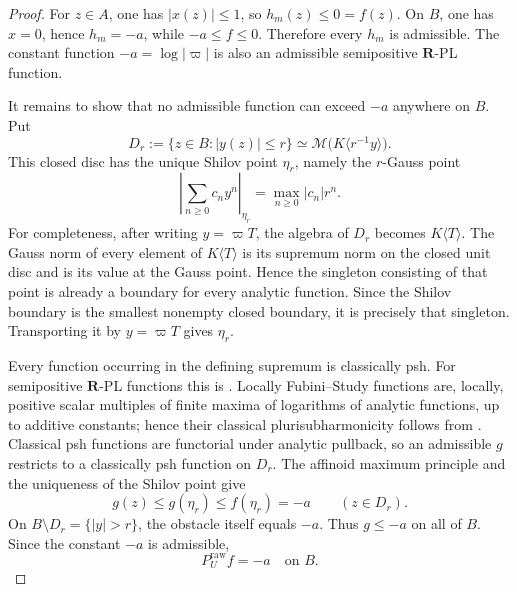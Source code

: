 \begin{proof}
For $z\in A$, one has $|x(z)|\leq1$, so $h_m(z)\leq0=f(z)$.
On $B$, one has $x=0$, hence $h_m=-a$, while
$-a\leq f\leq0$.  Therefore every $h_m$ is admissible.  The constant
function $-a=\log|\varpi|$ is also an admissible semipositive
$\mathbf R$-PL function.

It remains to show that no admissible function can exceed $-a$ anywhere
on $B$.  Put
\[
 D_r:=\{z\in B:|y(z)|\leq r\}
       \simeq\mathcal M\bigl(K\langle r^{-1}y\rangle\bigr).
\]
This closed disc has the unique Shilov point $\eta_r$, namely the
$r$-Gauss point
\begin{equation}
\label{eq:ch15-nodal-r-gauss}
 \left|\sum_{n\geq0}c_ny^n\right|_{\eta_r}
       =\max_{n\geq0}|c_n|r^n.
\end{equation}
For completeness, after writing $y=\varpi T$, the algebra of $D_r$
becomes $K\langle T\rangle$.  The Gauss norm of every element of
$K\langle T\rangle$ is its supremum norm on the closed unit disc and is
its value at the Gauss point.  Hence the singleton consisting of that point
is already a boundary for every analytic function.  Since the Shilov
boundary is the smallest nonempty closed boundary, it is precisely that
singleton.  Transporting it by $y=\varpi T$ gives $\eta_r$.

Every function occurring in the defining supremum is classically psh.  For
semipositive $\mathbf R$-PL functions this is
\cite[Theorem~4.3]{GR25Classical}.  Locally Fubini--Study functions are,
locally, positive scalar multiples of finite maxima of logarithms of
analytic functions, up to additive constants; hence their classical
plurisubharmonicity follows from
\cite[Proposition~4.2(1)--(3)]{GR25Classical}.  Classical psh functions are
functorial under analytic pullback, so an admissible $g$ restricts to a
classically psh function on $D_r$.  The affinoid maximum principle
\cite[Theorem~6.4]{GR25Classical} and the uniqueness of the Shilov point give
\begin{equation}
\label{eq:ch15-nodal-disc-maximum}
             g(z)\leq g(\eta_r)
                    \leq f(\eta_r)
                    =-a
             \qquad (z\in D_r).
\end{equation}
On $B\setminus D_r=\{|y|>r\}$, the obstacle itself equals $-a$.
Thus $g\leq-a$ on all of $B$.  Since the constant $-a$ is admissible,
\begin{equation}
\label{eq:ch15-nodal-raw-on-b}
                         P_U^{\mathrm{raw}}f=-a
                         \quad\text{on }B.
\end{equation}


\end{proof}
